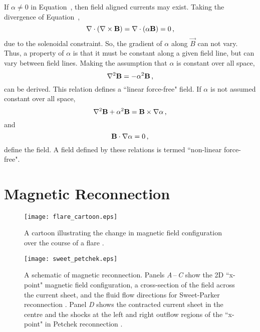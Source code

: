 If $\alpha \neq 0$ in Equation~\label{eqn:alphb}, then field aligned currents may exist. Taking the divergence of Equation~\label{eqn:alphb}, 
\begin{equation}
\nabla \cdot (\nabla \times \vec{B}) = \nabla \cdot (\alpha \vec{B}) = 0 \mbox{\,,}
\end{equation}
due to the solenoidal constraint. So, the gradient of $\alpha$ along $\vec{B}$ can not vary. Thus,  a property of $\alpha$ is that it must be constant along a given field line, but can vary between field lines. Making the assumption that $\alpha$ is constant over all space, %
\begin{equation}
\nabla^2 \vec{B} = -\alpha^2 \vec{B} \mbox{\,,}
\end{equation}
can be derived. This relation defines a ``linear force-free" field.
If $\alpha$ is not assumed constant over all space,
\begin{equation}
\nabla^2 \vec{B} + \alpha^2 \vec{B} = \vec{B} \times \nabla \alpha \mbox{\,,}
\end{equation}
and
\begin{equation}
\vec{B} \cdot \nabla \alpha = 0 \mbox{\,,}
\end{equation}
define the field. A field defined by these relations is termed ``non-linear force-free".



\section{Magnetic Reconnection}\label{sect:magreconnect}

\begin{figure}[!t]
\centerline{\texttt{[image: flare\_cartoon.eps]}}
\caption[The change in magnetic field configuration over the course of a flare.]{A cartoon illustrating the change in magnetic field configuration over the course of a flare \citep[from][]{Tanaka:1986}.}
\label{fig:flarecartoon}
\end{figure}

\begin{figure}[!t]
\centerline{\texttt{[image: sweet\_petchek.eps]}}
\caption[A schematic of magnetic reconnection.]{A schematic of magnetic reconnection. Panels \emph{A}\,--\,\emph{C} show the 2D ``x-point" magnetic field configuration, a cross-section of the field across the current sheet, and the fluid flow directions for Sweet-Parker reconnection \citep[from][]{Sweet:1958}. Panel \emph{D} shows the contracted current sheet in the centre and the shocks at the left and right outflow regions of the ``x-point" in Petchek reconnection \citep[from][]{Fitzpatrick:2012}.}
\label{fig:xpoints}
\end{figure}

